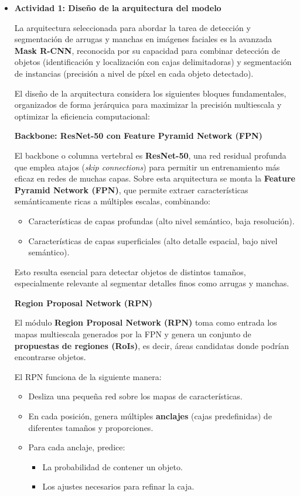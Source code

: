 \begin{enumerate}
\begin{itemize}
 
  \item\textbf{Actividad 1: Diseño de la arquitectura del modelo}

La arquitectura seleccionada para abordar la tarea de detección y segmentación de arrugas y manchas en imágenes faciales es la avanzada \textbf{Mask R-CNN}, reconocida por su capacidad para combinar detección de objetos (identificación y localización con cajas delimitadoras) y segmentación de instancias (precisión a nivel de píxel en cada objeto detectado).

El diseño de la arquitectura considera los siguientes bloques fundamentales, organizados de forma jerárquica para maximizar la precisión multiescala y optimizar la eficiencia computacional:

\textbf{Backbone: ResNet-50 con Feature Pyramid Network (FPN)}

El backbone o columna vertebral es \textbf{ResNet-50}, una red residual profunda que emplea atajos (\textit{skip connections}) para permitir un entrenamiento más eficaz en redes de muchas capas. Sobre esta arquitectura se monta la \textbf{Feature Pyramid Network (FPN)}, que permite extraer características semánticamente ricas a múltiples escalas, combinando:
\begin{itemize}
    \item Características de capas profundas (alto nivel semántico, baja resolución).
    \item Características de capas superficiales (alto detalle espacial, bajo nivel semántico).
\end{itemize}

Esto resulta esencial para detectar objetos de distintos tamaños, especialmente relevante al segmentar detalles finos como arrugas y manchas.

\textbf{Region Proposal Network (RPN)}

El módulo \textbf{Region Proposal Network (RPN)} toma como entrada los mapas multiescala generados por la FPN y genera un conjunto de \textbf{propuestas de regiones (RoIs)}, es decir, áreas candidatas donde podrían encontrarse objetos.

El RPN funciona de la siguiente manera:
\begin{itemize}
    \item Desliza una pequeña red sobre los mapas de características.
    \item En cada posición, genera múltiples \textbf{anclajes} (cajas predefinidas) de diferentes tamaños y proporciones.
    \item Para cada anclaje, predice:
    \begin{itemize}
        \item La probabilidad de contener un objeto.
        \item Los ajustes necesarios para refinar la caja.
    \end{itemize}
\end{itemize}


\end{itemize}
\end{enumerate}
